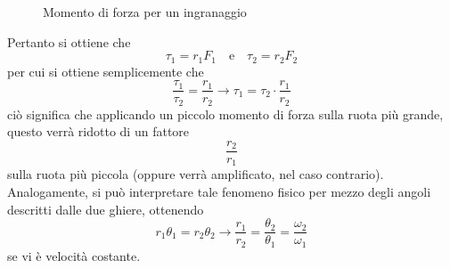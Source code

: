 \documentclass[a4paper]{extarticle}
\newcommand{\gear}[5]{%
    \foreach \i in {1,...,#1}
    {   [rotate=(\i-1)*360/#1] (0:#2) arc (0:#4:#2) {[rounded corners=0.5pt] -- (#4+#5:#3)  arc (#4+#5:360/#1-#5:#3)} --  (360/#1:#2)
    }
}
\begin{document}
\begin{figure}[H]
  \centering

  \pgfmathsetmacro{\rTwo}{\rOne*\nTwo/\nOne}%
  \pgfmathsetmacro{\ROne}{\rOne+\toothHeight}%
  \pgfmathsetmacro{\RTwo}{\rTwo+\toothHeight}

  \caption{Momento di forza per un ingranaggio}
  \label{fig:momento_forza_ingranaggio}
\end{figure}

\vspace{1em}
\noindent
Pertanto si ottiene che
\[\tau_1 = r_1 F_1 \hspace{1em} \text{e} \hspace{1em} \tau_2 = r_2 F_2\]
per cui si ottiene semplicemente che
\[\boxed{\frac{\tau_1}{\tau_2}=\frac{r_1}{r_2} \longrightarrow \tau_1=\tau_2 \cdot \frac{r_1}{r_2}}\]
ciò significa che applicando un piccolo momento di forza sulla ruota più grande, questo verrà ridotto di un fattore
\[\frac{r_2}{r_1}\]
sulla ruota più piccola (oppure verrà amplificato, nel caso contrario).\\
Analogamente, si può interpretare tale fenomeno fisico per mezzo degli angoli descritti dalle due ghiere, ottenendo
\[\boxed{r_1 \theta_1 = r_2 \theta_2 \longrightarrow \frac{r_1}{r_2}=\frac{\theta_2}{\theta_1} = \frac{\omega_2}{\omega_1}}\]
se vi è velocità costante.
\end{document}
